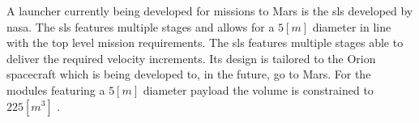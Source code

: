 A launcher currently being developed for missions to Mars is the \gls{sls} developed by \gls{nasa}. The \gls{sls} features multiple stages and allows for a $5 \left[m\right]$ diameter in line with the top level mission requirements. The \gls{sls} features multiple stages able to deliver the required velocity increments. Its design is tailored to the Orion spacecraft which is being developed to, in the future, go to Mars. For the modules featuring a $5 \left[m\right]$ diameter payload the volume is constrained to $225 \left[m^3\right]$ \cite{NASA2014}.


